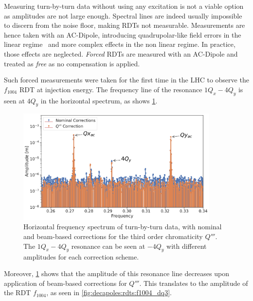 Measuring turn-by-turn data without using any excitation is not a viable option as amplitudes are
not large enough. Spectral lines are indeed usually impossible to discern from the noise floor, 
making RDTs not measurable.
Measurements are hence taken with an AC-Dipole, introducing quadrupolar-like field errors in the 
linear regime~\cite{carlier_nonlinear_2020} and more complex effects in the non linear regime.
In practice, those effects are neglected. \textit{Forced} RDTs are measured with an
AC-Dipole and treated as \textit{free} as no compensation is applied.

Such forced measurements were taken for the first time in the LHC to observe the $f_{1004}$ RDT
at injection energy. The frequency line of the resonance $1Q_x - 4Q_y$ is seen at $4Q_y$ in the
horizontal spectrum, as shows \cref{fig:decapoles:rdts:spectrum_f1004}.

\begin{figure}[H]
    \centering
    \includegraphics[width=0.9\textwidth]{./images/f1004x_spectrum.pdf}
    \caption{Horizontal frequency spectrum of turn-by-turn data, with nominal and beam-based
    corrections for the third order chromaticity $Q'''$. The $1Q_x - 4Q_y$ resonance can be seen
    at $-4Q_y$ with different amplitudes for each correction scheme.}
    \label{fig:decapoles:rdts:spectrum_f1004}
\end{figure}

Moreover, \cref{fig:decapoles:rdts:spectrum_f1004} shows that the amplitude of this resonance line
decreases upon application of beam-based corrections for $Q'''$. This translates to the amplitude
of the RDT $f_{1004}$, as seen in \cref{fig:decapoles:rdts:f1004_dq3}.

